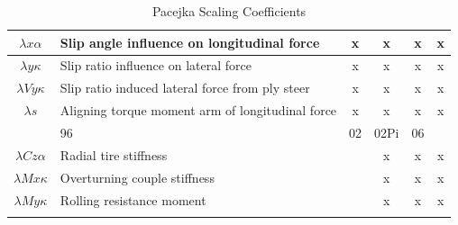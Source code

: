 \begin{center}
\begin{longtable}[c]{|c|p{4in}|cccc|}
			$\lambda x \alpha$	&Slip angle influence on longitudinal force	&x	&x &x	&x\\ \hline
			$\lambda y \kappa$	&Slip ratio influence on lateral force 	&x	&x	&x &x\\ \hline
			$\lambda Vy \kappa$	&Slip ratio induced lateral force from ply steer 	&x &x	&x	&x\\ \hline
			$\lambda s$	&Aligning torque moment arm of longitudinal force 	&x	&x &x	&x\\ \hline
			\rowcolor{ttblue}\multicolumn{2}{|c|}{\cellcolor{ttblue}\textbf{Other}}&96&	02&	02Pi&	06 \\ \hline					
			$\lambda Cz \alpha$	&Radial tire stiffness	&	&x	&x &x\\ \hline
			$\lambda Mx \kappa$	&Overturning couple stiffness 	&	&x &x	&x\\ \hline
			$\lambda My \kappa$	&Rolling resistance moment	&	&x	&x &x\\ \hline
			\caption{Pacejka Scaling Coefficients}
			\label{tbl:PacejkaScalingCoefficients}
\end{longtable}
\end{center}
